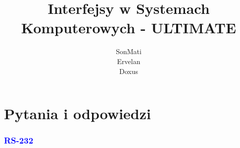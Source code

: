 \documentclass[a4paper,twoside]{article}
\begin{document}




\begin{titlepage}
\title{\huge Interfejsy w Systemach Komputerowych - ULTIMATE}
\author{\large SonMati \\ Ervelan \\ Doxus}
\maketitle
\end{titlepage}

\part{Pytania i odpowiedzi}

\section{\textcolor{blue}{RS-232}}
\end{document}
